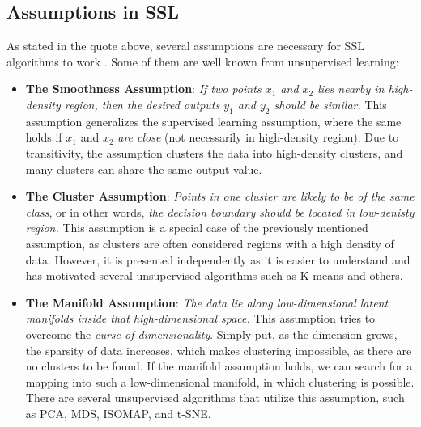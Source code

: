 \subsection*{Assumptions in SSL}
As stated in the quote above, several assumptions are necessary for SSL algorithms to work \cite[p. 5]{ssl-book-2006}. 
Some of them are well known from unsupervised learning:
\begin{itemize}
    \item \textbf{The Smoothness Assumption}: \textit{If two points $x_1$ and $x_2$ lies nearby in high-density region, then the desired outputs $y_1$ 
    and $y_2$ should be similar.} This assumption generalizes the supervised learning assumption, where the same holds if $x_1$ and $x_2$ \textit{are 
    close} (not necessarily in high-density region). Due to transitivity, the assumption clusters the data into high-density clusters, and many clusters
    can share the same output value.
    \item \textbf{The Cluster Assumption}: \textit{Points in one cluster are likely to be of the same class}, or in other words, \textit{the decision 
    boundary should be located in low-denisty region.} This assumption is a special case of the previously mentioned assumption, as clusters are often 
    considered regions with a high density of data. However, it is presented independently as it is easier to understand and has motivated several 
    unsupervised algorithms such as K-means and others. %
    \item \textbf{The Manifold Assumption}: \textit{The data lie along low-dimensional latent manifolds inside that high-dimensional space.} This
    assumption tries to overcome the \textit{curse of dimensionality}. Simply put, as the dimension grows, the sparsity of data increases, which makes 
    clustering impossible, as there are no clusters to be found. If the manifold assumption holds, we can search for a mapping into such a 
    low-dimensional manifold, in which clustering is possible. There are several unsupervised algorithms that utilize this assumption, such as PCA, 
    MDS, ISOMAP, and t-SNE.
\end{itemize}

